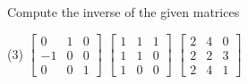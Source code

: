 \documentclass{ximera}
\begin{document}
\begin{exercise}%
    Compute the inverse of the given matrices
    \begin{tasks}(3)
        \task
        $\begin{bmatrix}
            0 & 1 & 0 \\
            -1 & 0 & 0 \\
            0 & 0 & 1
        \end{bmatrix}$
        \task
        $\begin{bmatrix}
            1 & 1 & 1 \\
            1 & 1 & 0 \\
            1 & 0 & 0
        \end{bmatrix}$
        \task
        $\begin{bmatrix}
            2 & 4 & 0 \\
            2 & 2 & 3 \\
            2 & 4 & 1
        \end{bmatrix}$
    \end{tasks}
\end{exercise}
\end{document}
